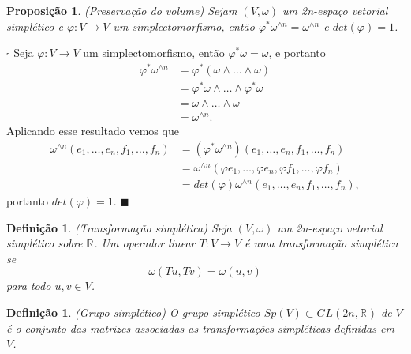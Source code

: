 \documentclass[12pt]{book}
\newtheorem{definicao}[teorema]{Definição}
\newtheorem{proposicao}[teorema]{Proposição}
\newenvironment{prova}[1]{$\square$ #1}{\hfill$\blacksquare$}
\newcommand{\formaSimpletica}[2]{\omega(#1, #2)}
\newcommand{\generalgroup}[2]{GL(#1, #2)}
\newcommand{\generalgroupreal}[1]{\generalgroup{#1}{\real{}}}
\newcommand{\gruposimpletico}[1]{Sp(#1)}
\newcommand{\real}[1]{\mathbb{R}^{#1}}
\newcommand{\reta}{\real{}}
\begin{document}
	\begin{proposicao}\label{proposicao_preservacao_volume}
		(Preservação do volume) Sejam $(V,\omega)$ um 2n-espaço vetorial simplético e $\varphi:V\to V$ um simplectomorfismo, então $\varphi^{*}\omega^{\wedge n}=\omega^{\wedge n}$ e $det(\varphi)=1$.
	\end{proposicao}
	\begin{prova}
		Seja $\varphi:V \to V$ um simplectomorfismo, então $\varphi^{*}\omega = \omega$, e portanto
		$$
		\begin{aligned}
		\varphi^{*}\omega^{\wedge n} 
		&= 
		\varphi^{*}(\omega\wedge \dots \wedge\omega) 
		\\
		&= \varphi^{*}\omega\wedge \dots \wedge\varphi^{*}\omega
		\\
		&=\omega\wedge \dots \wedge \omega 
		\\
		&= \omega^{\wedge n}.
		\end{aligned} 
		$$
		Aplicando esse resultado vemos que
		$$
		\begin{aligned}
		\omega^{\wedge n}(e_{1}, \dots,e_{n}, f_{1},\dots, f_{n})
		&=(\varphi^{*}\omega^{\wedge n})(e_{1}, \dots, e_{n}, f_{1},\dots, f_{n})
		\\
		&=
		\omega^{\wedge n}(\varphi e_{1}, \dots,\varphi  e_{n}, \varphi f_{1},\dots, \varphi f_{n})
		\\
		&=det(\varphi)\omega^{\wedge n}(e_{1}, \dots, e_{n}, f_{1},\dots, f_{n}),
		\end{aligned}
		$$
		portanto $det(\varphi) = 1$.
	\end{prova}
	
	
	\begin{definicao}\label{definicao_transformacao_simpletica}
		(Transformação simplética) Seja $(V, \omega)$ um 2n-espaço vetorial simplético sobre $\reta$. Um operador linear $T: V \to V$ é uma transformação simplética se 
		$$
		\formaSimpletica{Tu}{Tv} = \formaSimpletica{u}{v}
		$$ para todo $u,v\in V$.
	\end{definicao}
	
	\begin{definicao}\label{definicao_grupo_simpletico}
		(Grupo simplético) O grupo simplético $\gruposimpletico{V} \subset \generalgroupreal{2n}$ de $V$ é o conjunto das matrizes associadas as transformações simpléticas definidas em $V$.
	\end{definicao}
	
\end{document}
